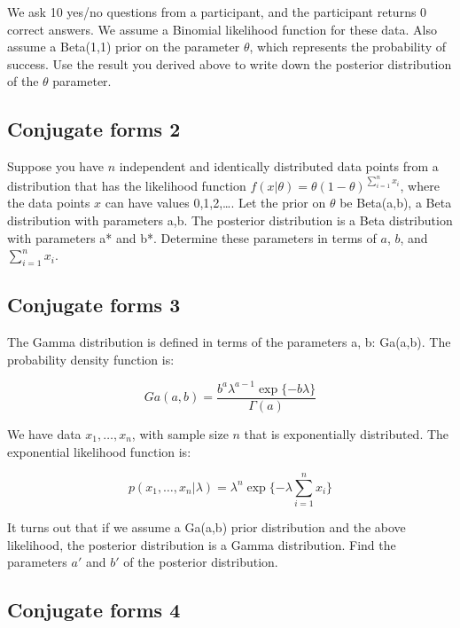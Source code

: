 \documentclass[12pt,]{krantz}
\theoremstyle{definition}
\theoremstyle{definition}
\theoremstyle{definition}
\theoremstyle{remark}
\begin{document}
We ask 10 yes/no questions from a participant, and the participant returns 0 correct answers. We assume a Binomial likelihood function for these data. Also assume a Beta(1,1) prior on the parameter \(\theta\), which represents the probability of success. Use the result you derived above to write down the posterior distribution of the \(\theta\) parameter.

\hypertarget{conjugate-forms-2}{%
\subsection{Conjugate forms 2}\label{conjugate-forms-2}}

Suppose you have \(n\) independent and identically distributed data points from a distribution that has
the likelihood function \(f(x|\theta)=\theta(1-\theta)^{\sum_{i=1}^n x_i}\),
where the data points \(x\) can have values 0,1,2,\dots. Let the prior on \(\theta\) be Beta(a,b), a Beta distribution with parameters a,b.
The posterior distribution is a Beta distribution with parameters a* and b*.
Determine these parameters in terms of \(a\), \(b\), and \(\sum_{i=1}^n x_i\).

\hypertarget{conjugate-forms-3}{%
\subsection{Conjugate forms 3}\label{conjugate-forms-3}}

The Gamma distribution is defined in terms of the parameters a, b: Ga(a,b). The probability density function is:

\begin{equation}
Ga(a,b)=\frac{b^a \lambda^{a-1} \exp\{-b\lambda\}}{\Gamma(a)}
\end{equation}

We have data \(x_1,\dots, x_n\), with sample size \(n\) that is exponentially distributed. The exponential likelihood function is:

\begin{equation}
p(x_1,\dots,x_n | \lambda)=\lambda^n \exp \{-\lambda \sum_{i=1}^n x_i \}
\end{equation}

It turns out that if we assume a Ga(a,b) prior distribution and the above likelihood, the posterior distribution is a Gamma distribution. Find the parameters \(a'\) and \(b'\) of the posterior distribution.

\hypertarget{conjugate-forms-4}{%
\subsection{Conjugate forms 4}\label{conjugate-forms-4}}
\end{document}
